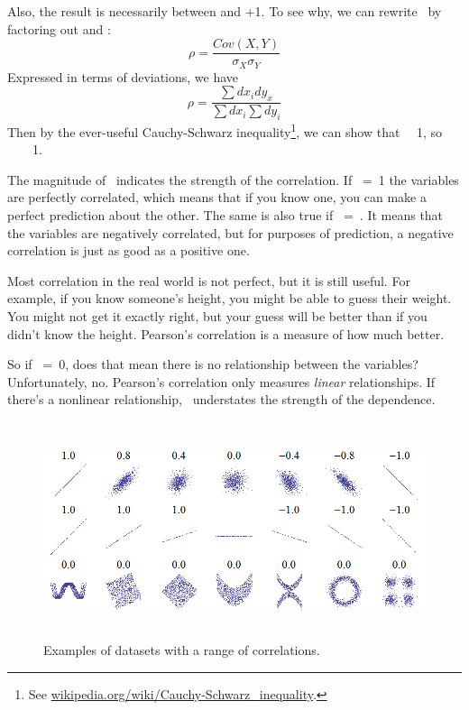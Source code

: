 \documentclass[12pt]{book}
\begin{document}
Also, the result is necessarily between  and +1.  To see why, we
can rewrite \myrho~by factoring out \mysigma {} and \mysigma {}:
%
\[ \rho = \frac{Cov(X,Y)}{\sigma_X \sigma_Y} \]
%
Expressed in terms of deviations, we have
%
\[ \rho = \frac{\sum dx_i dy_x}{\sum dx_i \sum dy_i} \]
%
Then by the ever-useful Cauchy-Schwarz inequality\footnote{See
  \url{wikipedia.org/wiki/Cauchy-Schwarz_inequality}.}, we can show
that \myrho{}~\myle~1, so ~\myle~\myrho~\myle~1.

The magnitude of \myrho~indicates the strength of the correlation.  If
\myrho~=~1 the variables are perfectly correlated, which means that if
you know one, you can make a perfect prediction about the other.  The
same is also true if \myrho~=~.  It means that the variables
are negatively correlated, but for purposes of prediction, a
negative correlation is just as good as a positive one.

Most correlation in the real world is not perfect, but it
is still useful.  For example, if you know someone's height, you might
be able to guess their weight.  You might not get it exactly right, but
your guess will be better than if you didn't know the height.
Pearson's correlation is a measure of how much better.

So if \myrho~=~0, does that mean there is no
relationship between the variables?  Unfortunately, no.  Pearson's
correlation only measures {\em linear} relationships.  If there's a
nonlinear relationship, \myrho~understates the strength of the
dependence.

\begin{figure}
\centerline{\includegraphics[height=2.5in]{figs/Correlation_examples.png}}
\caption{Examples of datasets with a range of correlations.}
\label{corr_examples}
\end{figure}
\end{document}
